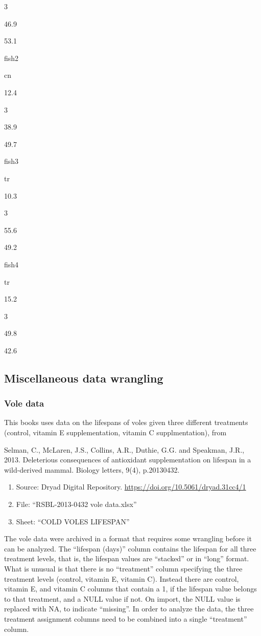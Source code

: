 \documentclass[]{book}
\providecommand{\tightlist}{%
  \setlength{\itemsep}{0pt}\setlength{\parskip}{0pt}}
\begin{document}
3

46.9

53.1

fish2

cn

12.4

3

38.9

49.7

fish3

tr

10.3

3

55.6

49.2

fish4

tr

15.2

3

49.8

42.6

\subsection{Miscellaneous data
wrangling}\label{miscellaneous-data-wrangling}

\hypertarget{vole-data}{\subsubsection{Vole data}\label{vole-data}}

This books uses data on the lifespans of voles given three different
treatments (control, vitamin E supplementation, vitamin C
supplmentation), from

Selman, C., McLaren, J.S., Collins, A.R., Duthie, G.G. and Speakman,
J.R., 2013. Deleterious consequences of antioxidant supplementation on
lifespan in a wild-derived mammal. Biology letters, 9(4), p.20130432.

\begin{enumerate}
\def\labelenumi{\arabic{enumi}.}
\tightlist
\item
  Source: Dryad Digital Repository.
  \url{https://doi.org/10.5061/dryad.31cc4/1}
\item
  File: ``RSBL-2013-0432 vole data.xlsx''
\item
  Sheet: ``COLD VOLES LIFESPAN''
\end{enumerate}

The vole data were archived in a format that requires some wrangling
before it can be analyzed. The ``lifespan (days)'' column contains the
lifespan for all three treatment levels, that is, the lifespan values
are ``stacked'' or in ``long'' format. What is unusual is that there is
no ``treatment'' column specifying the three treatment levels (control,
vitamin E, vitamin C). Instead there are control, vitamin E, and vitamin
C columns that contain a 1, if the lifespan value belongs to that
treatment, and a NULL value if not. On import, the NULL value is
replaced with NA, to indicate ``missing''. In order to analyze the data,
the three treatment assignment columns need to be combined into a single
``treatment'' column.
\end{document}
